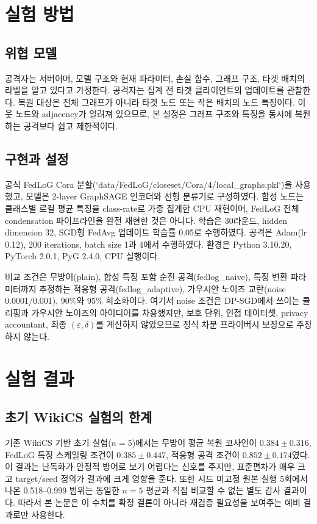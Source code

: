 \documentclass[10pt,twocolumn]{article}
\begin{document}
\section{실험 방법}
\subsection{위협 모델}
공격자는 서버이며, 모델 구조와 현재 파라미터, 손실 함수, 그래프 구조, 타겟 배치의 라벨을 알고 있다고 가정한다. 공격자는 집계 전 타겟 클라이언트의 업데이트를 관찰한다. 복원 대상은 전체 그래프가 아니라 타겟 노드 또는 작은 배치의 노드 특징이다. 이웃 노드와 adjacency가 알려져 있으므로, 본 설정은 그래프 구조와 특징을 동시에 복원하는 공격보다 쉽고 제한적이다.

\subsection{구현과 설정}
공식 FedLoG Cora 분할(`data/FedLoG/closeset/Cora/4/local_graphs.pkl`)을 사용했고, 모델은 2-layer GraphSAGE 인코더와 선형 분류기로 구성하였다. 합성 노드는 클래스별 로컬 평균 특징을 class-rate로 가중 집계한 CPU 재현이며, FedLoG 전체 condensation 파이프라인을 완전 재현한 것은 아니다. 학습은 30라운드, hidden dimension 32, SGD형 FedAvg 업데이트 학습률 0.05로 수행하였다. 공격은 Adam(lr 0.12), 200 iterations, batch size 1과 4에서 수행하였다. 환경은 Python 3.10.20, PyTorch 2.0.1, PyG 2.4.0, CPU 실행이다.

비교 조건은 무방어(plain), 합성 특징 포함 순진 공격(fedlog\_naive), 특징 변환 파라미터까지 추정하는 적응형 공격(fedlog\_adaptive), 가우시안 노이즈 교란(noise 0.0001/0.001), 90\%와 95\% 희소화이다. 여기서 noise 조건은 DP-SGD에서 쓰이는 클리핑과 가우시안 노이즈의 아이디어를 차용했지만, 보호 단위, 인접 데이터셋, privacy accountant, 최종 $(\varepsilon,\delta)$를 계산하지 않았으므로 정식 차분 프라이버시 보장으로 주장하지 않는다.

\section{실험 결과}
\subsection{초기 WikiCS 실험의 한계}
기존 WikiCS 기반 초기 실험($n=5$)에서는 무방어 평균 복원 코사인이 $0.384 \pm 0.316$, FedLoG 특징 스케일링 조건이 $0.385 \pm 0.447$, 적응형 공격 조건이 $0.852 \pm 0.174$였다. 이 결과는 난독화가 안정적 방어로 보기 어렵다는 신호를 주지만, 표준편차가 매우 크고 target/seed 정의가 결과에 크게 영향을 준다. 또한 시드 미고정 원본 실행 5회에서 나온 0.518--0.999 범위는 동일한 $n=5$ 평균과 직접 비교할 수 없는 별도 감사 결과이다. 따라서 본 논문은 이 수치를 확정 결론이 아니라 재검증 필요성을 보여주는 예비 결과로만 사용한다.
\end{document}
